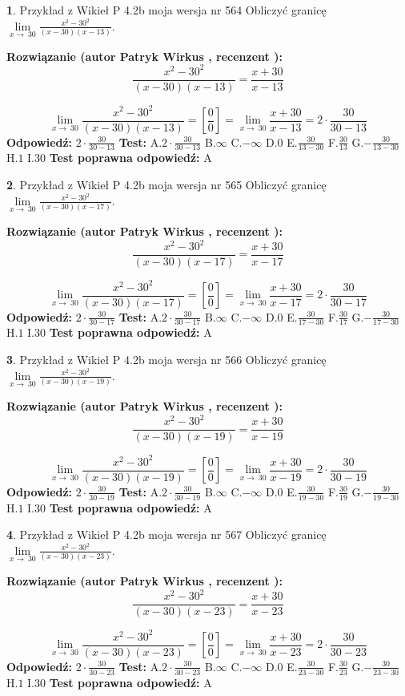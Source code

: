 \documentclass[12pt, a4paper]{article}
\theoremstyle{definition} %
\newtheorem{zad}{}
\newcommand{\zadStart}[1]{\begin{zad}#1\newline}
\newcommand{\zadStop}{\end{zad}}
\newcommand{\rozwStart}[2]{\noindent \textbf{Rozwiązanie (autor #1 , recenzent #2): }\newline}
\newcommand{\rozwStop}{\newline}
\newcommand{\odpStart}{\noindent \textbf{Odpowiedź:}\newline}
\newcommand{\odpStop}{\newline}
\newcommand{\testStart}{\noindent \textbf{Test:}\newline}
\newcommand{\testStop}{\newline}
\newcommand{\kluczStart}{\noindent \textbf{Test poprawna odpowiedź:}\newline}
\newcommand{\kluczStop}{\newline}
\begin{document}
\zadStart{Przykład z Wikieł P 4.2b moja wersja nr 564}
Obliczyć granicę $\lim\limits_{x\to\ 30}\frac{x^{2}-30^{2}}{(x-30)(x-13)}$.
\zadStop
\rozwStart{Patryk Wirkus}{}
$$\frac{x^{2}-30^{2}}{(x-30)(x-13)}=\frac{x+30}{x-13}$$

$$\lim\limits_{x\to\ 30}\frac{x^{2}-30^{2}}{(x-30)(x-13)}=[\frac{0}{0}]=\lim\limits_{x\to\ 30}\frac{x+30}{x-13}=2 \cdot \frac{30}{30-13}$$
\rozwStop
\odpStart
$2 \cdot \frac{30}{30-13}$
\odpStop
\testStart
A.$2 \cdot \frac{30}{30-13}$
B.$\infty$
C.$-\infty$
D.$0$
E.$\frac{30}{13-30}$
F.$\frac{30}{13}$
G.$-\frac{30}{13-30}$
H.$1$
I.$30$
\testStop
\kluczStart
A
\kluczStop



\zadStart{Przykład z Wikieł P 4.2b moja wersja nr 565}
Obliczyć granicę $\lim\limits_{x\to\ 30}\frac{x^{2}-30^{2}}{(x-30)(x-17)}$.
\zadStop
\rozwStart{Patryk Wirkus}{}
$$\frac{x^{2}-30^{2}}{(x-30)(x-17)}=\frac{x+30}{x-17}$$

$$\lim\limits_{x\to\ 30}\frac{x^{2}-30^{2}}{(x-30)(x-17)}=[\frac{0}{0}]=\lim\limits_{x\to\ 30}\frac{x+30}{x-17}=2 \cdot \frac{30}{30-17}$$
\rozwStop
\odpStart
$2 \cdot \frac{30}{30-17}$
\odpStop
\testStart
A.$2 \cdot \frac{30}{30-17}$
B.$\infty$
C.$-\infty$
D.$0$
E.$\frac{30}{17-30}$
F.$\frac{30}{17}$
G.$-\frac{30}{17-30}$
H.$1$
I.$30$
\testStop
\kluczStart
A
\kluczStop



\zadStart{Przykład z Wikieł P 4.2b moja wersja nr 566}
Obliczyć granicę $\lim\limits_{x\to\ 30}\frac{x^{2}-30^{2}}{(x-30)(x-19)}$.
\zadStop
\rozwStart{Patryk Wirkus}{}
$$\frac{x^{2}-30^{2}}{(x-30)(x-19)}=\frac{x+30}{x-19}$$

$$\lim\limits_{x\to\ 30}\frac{x^{2}-30^{2}}{(x-30)(x-19)}=[\frac{0}{0}]=\lim\limits_{x\to\ 30}\frac{x+30}{x-19}=2 \cdot \frac{30}{30-19}$$
\rozwStop
\odpStart
$2 \cdot \frac{30}{30-19}$
\odpStop
\testStart
A.$2 \cdot \frac{30}{30-19}$
B.$\infty$
C.$-\infty$
D.$0$
E.$\frac{30}{19-30}$
F.$\frac{30}{19}$
G.$-\frac{30}{19-30}$
H.$1$
I.$30$
\testStop
\kluczStart
A
\kluczStop



\zadStart{Przykład z Wikieł P 4.2b moja wersja nr 567}
Obliczyć granicę $\lim\limits_{x\to\ 30}\frac{x^{2}-30^{2}}{(x-30)(x-23)}$.
\zadStop
\rozwStart{Patryk Wirkus}{}
$$\frac{x^{2}-30^{2}}{(x-30)(x-23)}=\frac{x+30}{x-23}$$

$$\lim\limits_{x\to\ 30}\frac{x^{2}-30^{2}}{(x-30)(x-23)}=[\frac{0}{0}]=\lim\limits_{x\to\ 30}\frac{x+30}{x-23}=2 \cdot \frac{30}{30-23}$$
\rozwStop
\odpStart
$2 \cdot \frac{30}{30-23}$
\odpStop
\testStart
A.$2 \cdot \frac{30}{30-23}$
B.$\infty$
C.$-\infty$
D.$0$
E.$\frac{30}{23-30}$
F.$\frac{30}{23}$
G.$-\frac{30}{23-30}$
H.$1$
I.$30$
\testStop
\kluczStart
A
\kluczStop
\end{document}
